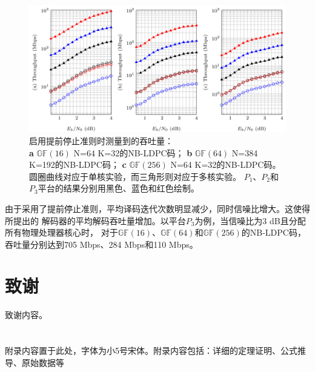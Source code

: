 \documentclass{cjc}
\begin{document}
\begin{figure}
  \includegraphics[width=\linewidth]{assets/fig5.png}
  \caption{
    启用提前停止准则时测量到的吞吐量：\\
    \textbf{a} $\mathbb{GF}(16)$ N=64 K=32的NB-LDPC码；
    \textbf{b} $\mathbb{GF}(64)$ N=384 K=192的NB-LDPC码；
    \textbf{c} $\mathbb{GF}(256)$ N=64 K=32的NB-LDPC码。\\
    圆圈曲线对应于单核实验，而三角形则对应于多核实验。
    $P_1$、$P_2$和$P_3$平台的结果分别用黑色、蓝色和红色绘制。
  }\label{fig:5}
\end{figure}

  由于采用了提前停止准则，平均译码迭代次数明显减少，同时信噪比增大。这使得所提出的
  解码器的平均解码吞吐量增加。以平台$P_3$为例，当信噪比为3 dB且分配所有物理处理器核心时，
  对于$\mathbb{GF}(16)$、$\mathbb{GF}(64)$和$\mathbb{GF}(256)$的NB-LDPC码，
  吞吐量分别达到705 Mbps、284 Mbps和110 Mbps。

\section*{致谢}

致谢内容。


\nocite{*}






\appendix

\section{}

附录内容置于此处，字体为小5号宋体。附录内容包括：详细的定理证明、公式推导、原始数据等










\end{document}
